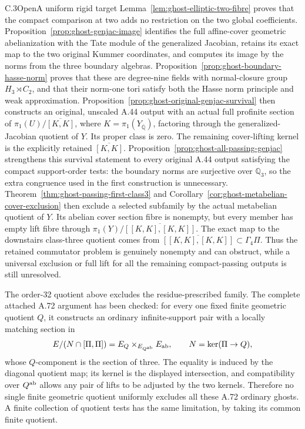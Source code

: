 \begin{result}{C.3}{Open}{A uniform rigid target}
Lemma~\ref{lem:ghost-elliptic-two-fibre} proves that the
compact comparison at two adds no restriction on the two
global coefficients. Proposition~\ref{prop:ghost-genjac-image}
identifies the full affine-cover geometric abelianization
with the Tate module of the generalized Jacobian, retains
its exact map to the two original Kummer coordinates, and
computes its image by the norms from the three boundary
algebras. Proposition~\ref{prop:ghost-boundary-hasse-norm}
proves that these are degree-nine fields with normal-closure
group \(H_3\rtimes C_2\), and that their norm-one tori satisfy
both the Hasse norm principle and weak approximation.
Proposition~\ref{prop:ghost-original-genjac-survival} then
constructs an original, unscaled A.44 output with an actual
full profinite section of
\(\pi_1(U)/\overline{[K,K]}\), where
\(K=\pi_1(Y_{\overline{\mathbb Q}})\), factoring through the
generalized-Jacobian quotient of \(Y\). Its proper class is
zero. The remaining cover-lifting kernel is the explicitly
retained \(\overline{[K,K]}\).
Proposition~\ref{prop:ghost-all-passing-genjac} strengthens
this survival statement to every original A.44 output
satisfying the compact support-order tests: the boundary
norms are surjective over \(\mathbb Q_3\), so the extra
congruence used in the first construction is unnecessary.
Theorem~\ref{thm:ghost-passing-first-class3} and
Corollary~\ref{cor:ghost-metabelian-cover-exclusion}
then exclude a selected subfamily by the actual
metabelian quotient of \(Y\). Its abelian cover
section fibre is nonempty, but every member has empty
lift fibre through
\(\pi_1(Y)/\overline{[[K,K],[K,K]]}\).
The exact map to the downstairs class-three quotient
comes from
\(\overline{[[K,K],[K,K]]}\subset\Gamma_4\Pi\).
Thus the retained commutator problem is genuinely
nonempty and can obstruct, while a universal exclusion
or full lift for all the remaining compact-passing
outputs is still unresolved.

The order-32 quotient above excludes the residue-prescribed
family. The complete attached A.72 argument has been checked:
for every one fixed finite geometric quotient \(Q\), it
constructs an ordinary infinite-support pair with a locally
matching section in
\[
 E/(N\cap[\Pi,\Pi])
       =E_Q\mathbin{\times}_{E_{Q^{\rm ab}}}E_{\rm ab},
       \qquad N=\ker(\Pi\to Q),
\]
whose \(Q\)-component is the section of three. The equality
is induced by the diagonal quotient map; its kernel is the
displayed intersection, and compatibility over \(Q^{\rm ab}\)
allows any pair of lifts to be adjusted by the two kernels.
Therefore no single finite geometric quotient uniformly
excludes all these A.72 ordinary ghosts. A finite collection
of quotient tests has the same limitation, by taking its
common finite quotient.


\end{result}
